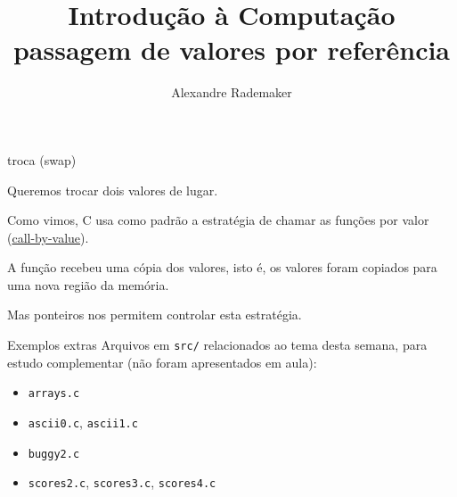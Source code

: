 \documentclass{beamer}
\title{Introdução à Computação \\ passagem de valores por referência}
\author{Alexandre Rademaker}
\date{}
\begin{document}
\begin{frame}
 \maketitle
\end{frame}


\begin{frame}{troca (swap)}

  Queremos trocar dois valores de lugar. 

  
  
  \framebreak

  Como vimos, C usa como padrão a estratégia de chamar as funções por
  valor
  (\href{https://en.wikipedia.org/wiki/Evaluation_strategy#Call_by_value}{call-by-value}).

  A função  recebeu uma cópia dos valores, isto é, os
  valores foram copiados para uma nova região da memória.

  Mas ponteiros nos permitem controlar esta estratégia.

  \framebreak

  

\end{frame}



\begin{frame}{Exemplos extras}
  Arquivos em \texttt{src/} relacionados ao tema desta semana, para
  estudo complementar (não foram apresentados em aula):
  \begin{itemize}
    \item \texttt{arrays.c}
    \item \texttt{ascii0.c}, \texttt{ascii1.c}
    \item \texttt{buggy2.c}
    \item \texttt{scores2.c}, \texttt{scores3.c}, \texttt{scores4.c}
  \end{itemize}
\end{frame}
\end{document}
